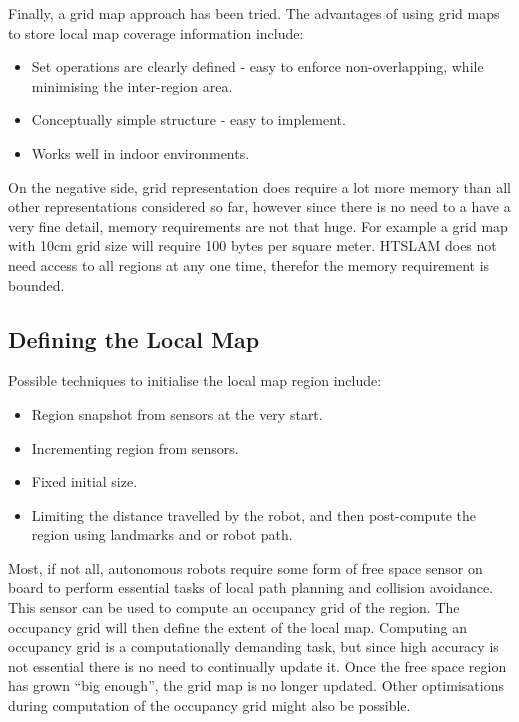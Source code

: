 Finally, a grid map approach has been tried. The advantages of using
grid maps to store local map coverage information include:

\begin{itemize}
\item Set operations are clearly defined - easy to enforce
non-overlapping, while minimising the inter-region area.

\item Conceptually simple structure - easy to implement.

\item Works well in indoor environments.
\end{itemize}

On the negative side, grid representation does require a lot more memory
than all other representations considered so far, however since there
is no need to a have a very fine detail, memory requirements are not
that huge. For example a grid map with 10cm grid size will require 100
bytes per square meter. HTSLAM does not need access to all regions at
any one time, therefor the memory requirement is bounded.

\subsection{Defining the Local Map}

Possible techniques to initialise the local map region include:

\begin{itemize}
 \item Region snapshot from sensors at the very start.
 \item Incrementing region from sensors.
 \item Fixed initial size.
 \item Limiting the distance travelled by the robot, and then post-compute
 the region using landmarks and or robot path.
\end{itemize}

Most, if not all, autonomous robots require some form of free space
sensor on board to perform essential tasks of local path planning and
collision avoidance. This sensor can be used to compute an occupancy
grid of the region. The occupancy grid will then define the extent of
the local map. Computing an occupancy grid is a computationally
demanding task, but since high accuracy is not essential there is no
need to continually update it. Once the free space region has grown
``big enough'', the grid map is no longer updated.  Other
optimisations during computation of the occupancy grid might also
be possible.

